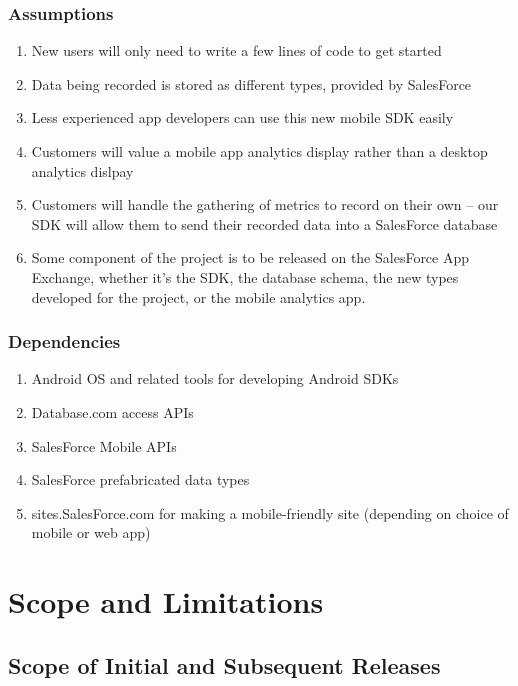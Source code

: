 \documentclass[12pt,oneside,letterpaper]{article}
\begin{document}
\subsubsection{Assumptions}
\begin{enumerate}[label = {\textbf{ASM-\arabic*}}, align = left, leftmargin = *, labelsep = 15pt]
\item New users will only need to write a few lines of code to get started
\item Data being recorded is stored as different types, provided by SalesForce
\item Less experienced app developers can use this new mobile SDK easily
\item Customers will value a mobile app analytics display rather than a desktop analytics dislpay
\item Customers will handle the gathering of metrics to record on their own -- our SDK will allow them to send their recorded data into a SalesForce database
\item Some component of the project is to be released on the SalesForce App Exchange, whether it's the SDK, the database schema, the new types developed for the project, or the mobile analytics app.
\end{enumerate}

\subsubsection {Dependencies}
\begin{enumerate}[label = {\textbf{DPN-\arabic*}}, align = left, leftmargin = *, labelsep = 15pt]
\item Android OS and related tools for developing Android SDKs
\item Database.com access APIs
\item SalesForce Mobile APIs
\item SalesForce prefabricated data types
\item sites.SalesForce.com for making a mobile-friendly site (depending on choice of mobile or web app)
\end{enumerate}

\newpage
\section{Scope and Limitations}
\subsection{Scope of Initial and Subsequent Releases}
\end{document}

